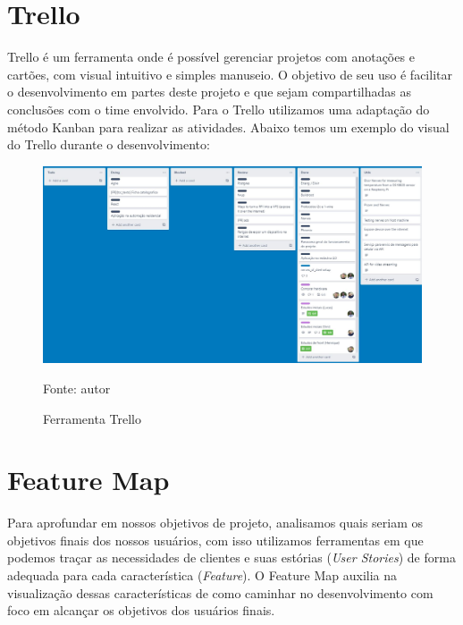 \documentclass[../../layout.tex]{subfiles}
\begin{document}
\section{Trello}
\hspace*{3em}Trello é um ferramenta onde é possível gerenciar projetos com anotações e cartões, com visual intuitivo e simples manuseio. O objetivo de seu uso é facilitar o desenvolvimento em partes deste projeto e que sejam compartilhadas as conclusões com o time envolvido. Para o Trello utilizamos uma adaptação do método Kanban para realizar as atividades.
\hspace*{3em}Abaixo temos um exemplo do visual do Trello durante o desenvolvimento:

\begin{figure}[H]
\centering
\caption{Ferramenta Trello}
\includegraphics[width=1\textwidth]{assets/static/img/trello.jpg}
\label{fig:i2c_structure}

\begin{minipage}{0.5\textwidth}
\raggedright \footnotesize Fonte: autor 
\end{minipage}
\end{figure}

\section{Feature Map}
\hspace*{3em}Para aprofundar em nossos objetivos de projeto, analisamos quais seriam os objetivos finais dos nossos usuários, com isso utilizamos ferramentas em que podemos traçar as necessidades de clientes e suas estórias (\emph{User Stories}) de forma adequada para cada característica (\emph{Feature}). O Feature Map auxilia na visualização dessas características de como caminhar no desenvolvimento com foco em alcançar os objetivos dos usuários finais.
\end{document}
